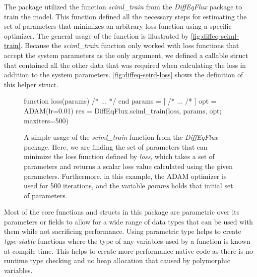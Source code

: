 The package utilized the function \textit{sciml\_train} from the \textit{DiffEqFlux} package to train the model.
This function defined all the necessary steps for estimating the set of parameters that minimizes an arbitrary loss function using a specific optimizer.
The general usage of the function is illustrated by \autoref{fig:diffeq-sciml-train}.
Because the \textit{sciml\_train} function only worked with loss functions that accept the system parameters as the only argument, we defined a callable struct that contained all the other data that was required when calculating the loss in addition to the system parameters.
\autoref{fig:diffeq-seird-loss} shows the definition of this helper struct.

\begin{figure}[!htb]
\begin{jllisting}
function loss(params)
    /* ... */
end
params = [ /* ... /* ]
opt = ADAM(lr=0.01)
res = DiffEqFlux.sciml_train(loss, params, opt; maxiters=500)
\end{jllisting}
\caption{A simple usage of the \textit{sciml\_train} function from the \textit{DiffEqFlux} package. Here, we are finding the set of parameters that can minimize the loss function defined by \textit{loss}, which takes a set of parameters and returns a scalar loss value calculated using the given parameters. Furthermore, in this example, the ADAM optimizer is used for 500 iterations, and the variable \textit{params} holds that initial set of parameters.}
\label{fig:diffeq-sciml-train}
\end{figure}

Most of the core functions and structs in this package are parametric over its parameters or fields to allow for a wide range of data types that can be used with them while not sacrificing performance.
Using parametric type helps to create \textit{type-stable} functions where the type of any variables used by a function is known at compile time.
This helps to create more performance native code as there is no runtime type checking and no heap allocation that caused by polymorphic variables.

